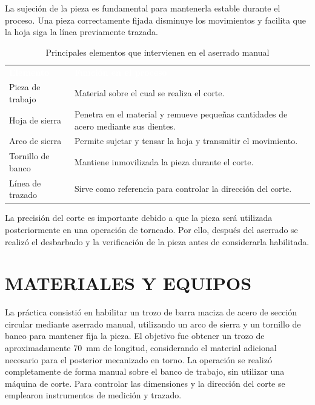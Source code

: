 \documentclass[12pt,a4paper]{article}
\newcommand{\encab}[1]{\textcolor{white}{\sffamily\bfseries #1}}
\begin{document}
La sujeción de la pieza es fundamental para mantenerla estable durante el
proceso. Una pieza correctamente fijada disminuye los movimientos y facilita que
la hoja siga la línea previamente trazada.

\vspace{6pt}

\begin{table}[!htb]
	\centering
	\caption{Principales elementos que intervienen en el aserrado manual}
	\small
	\begin{tabularx}{\linewidth}{
			>{\raggedright\arraybackslash}l
			>{\raggedright\arraybackslash}X
		}
		\rowcolor{darkblue}
		\encab{Elemento}  &
		\encab{Función en el proceso}
		\\
		Pieza de trabajo  &
		Material sobre el cual se realiza el corte.
		\\
		Hoja de sierra    &
		Penetra en el material y remueve pequeñas cantidades de acero mediante sus
		dientes.
		\\
		Arco de sierra    &
		Permite sujetar y tensar la hoja y transmitir el movimiento.
		\\
		Tornillo de banco &
		Mantiene inmovilizada la pieza durante el corte.
		\\
		Línea de trazado  &
		Sirve como referencia para controlar la dirección del corte.
		\\
	\end{tabularx}
\end{table}

\vspace{2pt}

La precisión del corte es importante debido a que la pieza será utilizada
posteriormente en una operación de torneado. Por ello, después del aserrado se
realizó el desbarbado y la verificación de la pieza antes de considerarla
habilitada.

\section{MATERIALES Y EQUIPOS}

La práctica consistió en habilitar un trozo de barra maciza de acero de sección
circular mediante aserrado manual, utilizando un arco de sierra y un tornillo de
banco para mantener fija la pieza. El objetivo fue obtener un trozo de
aproximadamente \SI{70}{\milli\metre} de longitud, considerando el material
adicional necesario para el posterior mecanizado en torno. La operación se
realizó completamente de forma manual sobre el banco de trabajo, sin utilizar
una máquina de corte. Para controlar las dimensiones y la dirección del corte se
emplearon instrumentos de medición y trazado.
\end{document}
